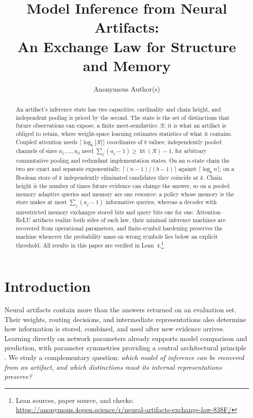 \documentclass{article}
\title{Model Inference from Neural Artifacts:\\An Exchange Law for Structure and Memory}
\author{Anonymous Author(s)}
\theoremstyle{definition}
\newcommand{\R}{\mathcal R}
\newcommand{\height}{\operatorname{ht}}
\begin{document}
\maketitle
\begin{abstract}
An artifact's inference state has two capacities, cardinality and chain height, and independent pooling is priced by the second. The state is the set of distinctions that future observations can expose, a finite meet-semilattice $\R$; it is what an artifact is obliged to retain, where weight-space learning estimates statistics of what it contains. Coupled attention needs $\lceil\log_b|\R|\rceil$ coordinates of $b$ values; independently pooled channels of sizes $a_1,\ldots,a_d$ need $\sum_j(a_j-1)\ge\height(\R)-1$, for arbitrary commutative pooling and redundant implementation states. On an $n$-state chain the two are exact and separate exponentially, $\lceil(n-1)/(b-1)\rceil$ against $\lceil\log_b n\rceil$; on a Boolean store of $k$ independently eliminated candidates they coincide at $k$. Chain height is the number of times future evidence can change the answer, so on a pooled memory adaptive queries and memory are one resource: a policy whose memory is the store makes at most $\sum_j(a_j-1)$ informative queries, whereas a decoder with unrestricted memory exchanges stored bits and query bits one for one. Attention--ReLU artifacts realize both sides of each law, their minimal inference machines are recovered from operational parameters, and finite-symbol hardening preserves the machine whenever the probability mass on wrong symbols lies below an explicit threshold. All results in this paper are verified in Lean~4.\footnote{Lean sources, paper source, and checks: \url{https://anonymous.4open.science/r/neural-artifacts-exchange-law-838F/}}
\end{abstract}

\section{Introduction}
Neural artifacts contain more than the answers returned on an evaluation set. Their weights, routing decisions, and intermediate representations also determine how information is stored, combined, and used after new evidence arrives. Learning directly on network parameters already supports model comparison and prediction, with parameter symmetries providing a central architectural principle \citep{zhou2023nfn}. We study a complementary question: \emph{which model of inference can be recovered from an artifact, and which distinctions must its internal representations preserve?}
\end{document}
